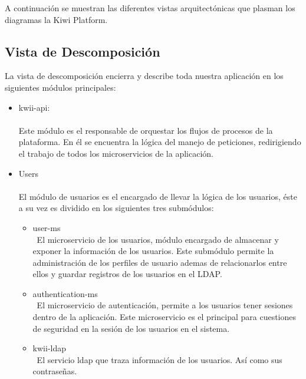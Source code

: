 A continuación se muestran las diferentes vistas arquitectónicas que plasman los diagramas la Kiwi Platform.

\subsection{Vista de Descomposición}
La vista de descomposición encierra y describe toda nuestra aplicación en los siguientes módulos principales:
\begin{itemize}
    \item kwii-api:\\\\
    Este módulo es el responsable de orquestar los flujos de procesos de la plataforma. En él se encuentra la lógica del manejo de peticiones, redirigiendo el trabajo de todos los microservicios de la aplicación.
    
    \item Users\\\\
    El módulo de usuarios es el encargado de llevar la lógica de los usuarios, éste a su vez es dividido en los siguientes tres submódulos:
    \begin{itemize}
        \item user-ms \\\
        El microservicio de los usuarios, módulo encargado de almacenar y exponer la información de los usuarios. Este submódulo permite la administración de los perfiles de usuario ademas de relacionarlos entre ellos y guardar registros de los usuarios en el LDAP.
        \item authentication-ms \\\
        El microservicio de autenticación, permite a los usuarios tener sesiones dentro de la aplicación. Este microservicio es el principal para cuestiones de seguridad en la sesión de los usuarios en el sistema.
        \item kwii-ldap\\\
        El servicio ldap que traza información de los usuarios. Así como sus contraseñas.
    \end{itemize}
    

\end{itemize}

